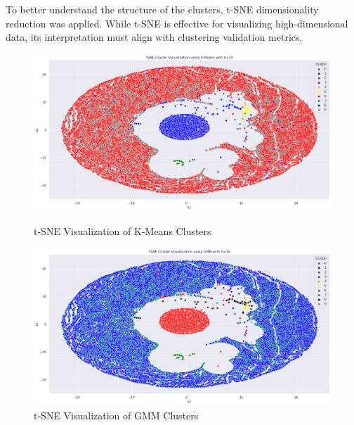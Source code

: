         To better understand the structure of the clusters, t-SNE dimensionality reduction was applied. While t-SNE is effective for visualizing high-dimensional data, its interpretation must align with clustering validation metrics. 
        
        \begin{figure}[h]
            \centering
            \begin{minipage}[c]{0.47\textwidth}
                \centering
                \includegraphics[width=\textwidth]{../figures/plots/section3/tsne_kmeans_clusters.png}
                \caption{t-SNE Visualization of K-Means Clusters}
                \label{fig:tsne_kmeans}
            \end{minipage}
            \hfill
            \begin{minipage}[c]{0.47\textwidth}
                \centering
                \includegraphics[width=\textwidth]{../figures/plots/section3/tsne_gmm_clusters.png}
                \caption{t-SNE Visualization of GMM Clusters}
                \label{fig:tsne_gmm}
            \end{minipage}
        \end{figure}

